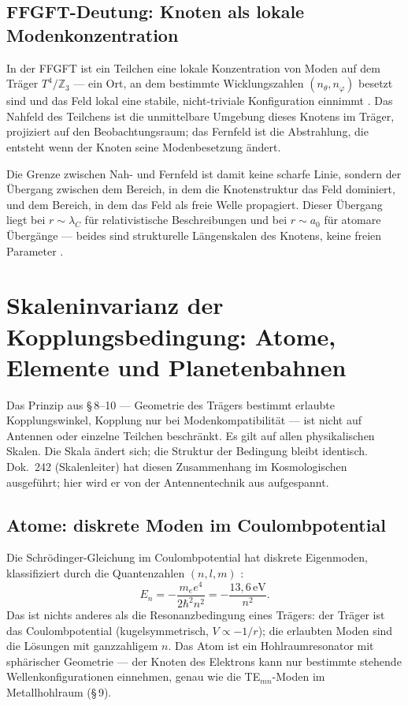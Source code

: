 \subsection*{FFGFT-Deutung: Knoten als lokale Modenkonzentration}

In der FFGFT ist ein Teilchen eine lokale Konzentration von Moden auf
dem Träger $T^4/\mathbb{Z}_3$ --- ein Ort, an dem bestimmte
Wicklungszahlen $(n_\theta, n_\varphi)$ besetzt sind und das Feld
lokal eine stabile, nicht-triviale Konfiguration einnimmt \SetzM.
Das Nahfeld des Teilchens ist die unmittelbare Umgebung dieses Knotens
im Träger, projiziert auf den Beobachtungsraum; das Fernfeld ist die
Abstrahlung, die entsteht wenn der Knoten seine Modenbesetzung ändert.

Die Grenze zwischen Nah- und Fernfeld ist damit keine scharfe Linie,
sondern der Übergang zwischen dem Bereich, in dem die Knotenstruktur
das Feld dominiert, und dem Bereich, in dem das Feld als freie Welle
propagiert. Dieser Übergang liegt bei $r\sim\lambda_C$ für relativistische
Beschreibungen und bei $r\sim a_0$ für atomare Übergänge --- beides
sind strukturelle Längenskalen des Knotens, keine freien Parameter \SM.

\section{Skaleninvarianz der Kopplungsbedingung: Atome, Elemente und Planetenbahnen}

Das Prinzip aus §\,8--10 --- Geometrie des Trägers bestimmt erlaubte
Kopplungswinkel, Kopplung nur bei Modenkompatibilität --- ist nicht auf
Antennen oder einzelne Teilchen beschränkt. Es gilt auf allen physikalischen
Skalen. Die Skala ändert sich; die Struktur der Bedingung bleibt identisch.
Dok.~242 (Skalenleiter) hat diesen Zusammenhang im Kosmologischen ausgeführt;
hier wird er von der Antennentechnik aus aufgespannt.

\subsection*{Atome: diskrete Moden im Coulombpotential}

Die Schrödinger-Gleichung im Coulombpotential hat diskrete Eigenmoden,
klassifiziert durch die Quantenzahlen $(n, l, m)$ \cite{Griffiths1995,CohenTannoudji1977}:
\[
  E_n = -\frac{m_e e^4}{2\hbar^2 n^2} = -\frac{13{,}6\,\mathrm{eV}}{n^2}.
\]
Das ist nichts anderes als die Resonanzbedingung eines Trägers: der
Träger ist das Coulombpotential (kugelsymmetrisch, $V\propto -1/r$);
die erlaubten Moden sind die Lösungen mit ganzzahligem $n$. Das Atom
ist ein Hohlraumresonator mit sphärischer Geometrie --- der Knoten
des Elektrons kann nur bestimmte stehende Wellenkonfigurationen
einnehmen, genau wie die TE$_{mn}$-Moden im Metallhohlraum (§\,9).

